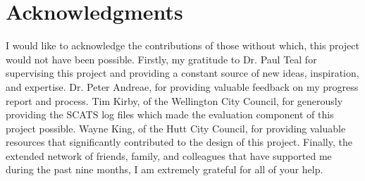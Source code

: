 \chapter*{Acknowledgments}\label{C:ack} 

I would like to acknowledge the contributions of those without which, this project would not have been possible. Firstly, my gratitude to Dr. Paul Teal for supervising this project and providing a constant source of new ideas, inspiration, and expertise. Dr. Peter Andreae, for providing valuable feedback on my progress report and process. Tim Kirby, of the Wellington City Council, for generously providing the SCATS log files which made the evaluation component of this project possible. Wayne King, of the Hutt City Council, for providing valuable resources that significantly contributed to the design of this project. Finally, the extended network of friends, family, and colleagues that have supported me during the past nine months, I am extremely grateful for all of your help.
